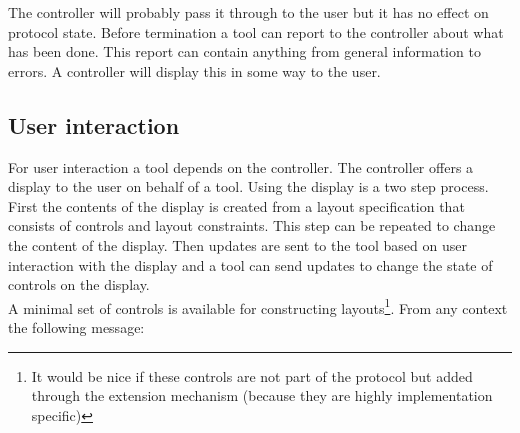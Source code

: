 \documentclass{article}
\begin{document}
   \noindent The controller will probably pass it through to the user but
   it has no effect on protocol state. Before termination a tool can report to
   the controller about what has been done. This report can contain anything
   from general information to errors. A controller will display this in some
   way to the user.

  \subsection{User interaction} \label{ss:user_interaction}

   For user interaction a tool depends on the controller. The controller offers
   a display to the user on behalf of a tool. Using the display is a two step
   process. First the contents of the display is created from a layout
   specification that consists of controls and layout constraints. This step
   can be repeated to change the content of the display. Then updates are sent
   to the tool based on user interaction with the display and a tool can send
   updates to change the state of controls on the display.
   \\[4pt]
   A minimal set of controls is available for constructing layouts\footnote{It
   would be nice if these controls are not part of the protocol but added
   through the extension mechanism (because they are highly implementation
   specific)}. From any context the following message:
   
\end{document}
